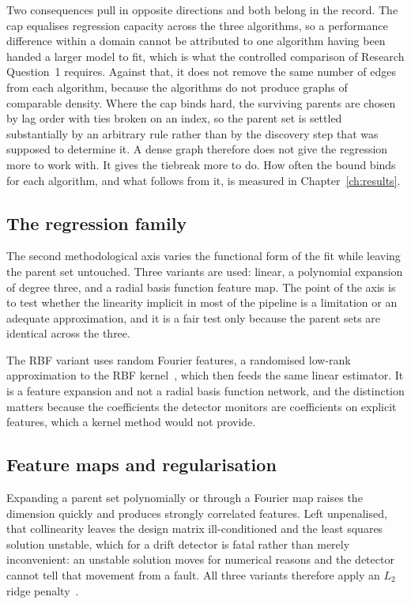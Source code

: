 Two consequences pull in opposite directions and both belong in the record. The cap equalises regression capacity across the three algorithms, so a performance difference within a domain cannot be attributed to one algorithm having been handed a larger model to fit, which is what the controlled comparison of Research Question~1 requires. Against that, it does not remove the same number of edges from each algorithm, because the algorithms do not produce graphs of comparable density. Where the cap binds hard, the surviving parents are chosen by lag order with ties broken on an index, so the parent set is settled substantially by an arbitrary rule rather than by the discovery step that was supposed to determine it. A dense graph therefore does not give the regression more to work with. It gives the tiebreak more to do. How often the bound binds for each algorithm, and what follows from it, is measured in Chapter~\ref{ch:results}.

\subsection{The regression family}
\label{sec:method-regression}

The second methodological axis varies the functional form of the fit while leaving the parent set untouched. Three variants are used: linear, a polynomial expansion of degree three, and a radial basis function feature map. The point of the axis is to test whether the linearity implicit in most of the pipeline is a limitation or an adequate approximation, and it is a fair test only because the parent sets are identical across the three.

The RBF variant uses random Fourier features, a randomised low-rank approximation to the RBF kernel~\cite{rahimi2007random}, which then feeds the same linear estimator. It is a feature expansion and not a radial basis function network, and the distinction matters because the coefficients the detector monitors are coefficients on explicit features, which a kernel method would not provide.

\subsection{Feature maps and regularisation}
\label{sec:bg-features}

Expanding a parent set polynomially or through a Fourier map raises the dimension quickly and produces strongly correlated features. Left unpenalised, that collinearity leaves the design matrix ill-conditioned and the least squares solution unstable, which for a drift detector is fatal rather than merely inconvenient: an unstable solution moves for numerical reasons and the detector cannot tell that movement from a fault. All three variants therefore apply an $L_2$ ridge penalty~\cite{hoerl1970ridge}.

